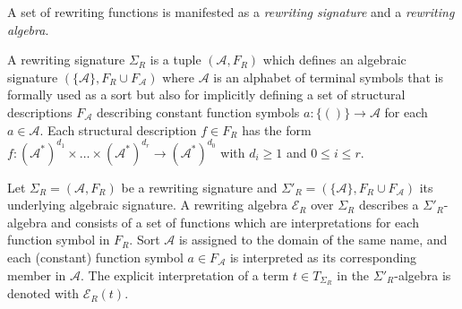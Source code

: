 \documentclass[
    a4paper,
    12pt,
    twoside,
    BCOR=12mm,
    parskip=half,
    chapterprefix,
    numbers=noenddot,
    bibliography=totoc
]{scrbook}
\begin{document}
A set of rewriting functions is manifested as a \emph{rewriting signature} and a \emph{rewriting algebra}.

\begin{definition}
	A rewriting signature $\Sigma_R$ is a tuple $(\mathcal{A},F_R)$ which defines an algebraic signature $(\{\mathcal{A}\},F_R \cup F_\mathcal{A})$ where $\mathcal{A}$ is an alphabet of terminal symbols that is formally used as a sort but also for implicitly defining a set of structural descriptions $F_\mathcal{A}$ describing constant function symbols $a: \{()\} \to \mathcal{A}$ for each $a \in \mathcal{A}$. Each structural description $f \in F_R$ has the form $f : (\mathcal{A}^*)^{d_1} \times \ldots \times (\mathcal{A}^*)^{d_r} \to (\mathcal{A}^*)^{d_0}$ with $d_i \geq 1$ and $0 \leq i \leq r$. 
\end{definition}

\begin{definition}
	Let $\Sigma_R = (\mathcal{A},F_R)$ be a rewriting signature and $\Sigma'_R=(\{\mathcal{A}\},F_R \cup F_\mathcal{A})$ its underlying algebraic signature.
	A rewriting algebra $\mathcal{E}_R$ over $\Sigma_R$ describes a $\Sigma'_R$-algebra and consists of a set of functions which are interpretations for each function symbol in $F_R$. Sort $\mathcal{A}$ is assigned to the domain of the same name, and each (constant) function symbol $a \in F_\mathcal{A}$ is interpreted as its corresponding member in $\mathcal{A}$.
	The explicit interpretation of a term $t \in T_{\Sigma_R}$ in the $\Sigma'_R$-algebra is denoted with $\mathcal{E}_R(t)$.
\end{definition}
\end{document}

